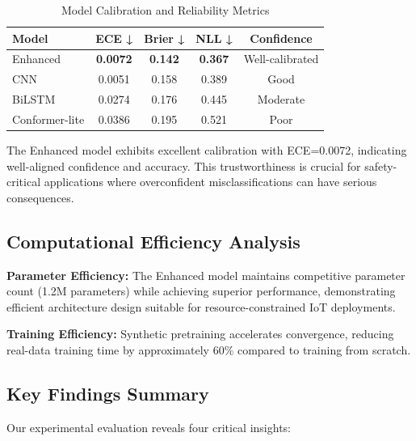 \documentclass[journal]{IEEEtran}
\begin{document}
\begin{table}[ht]
\centering
\caption{Model Calibration and Reliability Metrics}
\begin{tabular}{@{}lcccc@{}}
\toprule
Model & ECE ↓ & Brier ↓ & NLL ↓ & Confidence \\
\midrule
Enhanced & \textbf{0.0072} & \textbf{0.142} & \textbf{0.367} & Well-calibrated \\
CNN & 0.0051 & 0.158 & 0.389 & Good \\
BiLSTM & 0.0274 & 0.176 & 0.445 & Moderate \\
Conformer-lite & 0.0386 & 0.195 & 0.521 & Poor \\
\bottomrule
\end{tabular}
\label{tab:calibration}
\end{table}

The Enhanced model exhibits excellent calibration with ECE=0.0072, indicating well-aligned confidence and accuracy. This trustworthiness is crucial for safety-critical applications where overconfident misclassifications can have serious consequences.

\subsection{Computational Efficiency Analysis}

\textbf{Parameter Efficiency:} The Enhanced model maintains competitive parameter count (1.2M parameters) while achieving superior performance, demonstrating efficient architecture design suitable for resource-constrained IoT deployments.

\textbf{Training Efficiency:} Synthetic pretraining accelerates convergence, reducing real-data training time by approximately 60\% compared to training from scratch.

\subsection{Key Findings Summary}

Our experimental evaluation reveals four critical insights:
\end{document}
